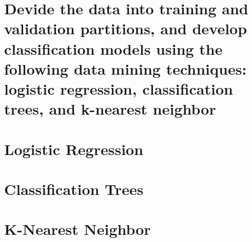 \newpage
\section{Devide the data into training and validation partitions, and develop classification models using the following data mining techniques: logistic regression, classification trees, and k-nearest neighbor} \label{appendix2}

\section*{Logistic Regression}
\section*{Classification Trees}
\section*{K-Nearest Neighbor}